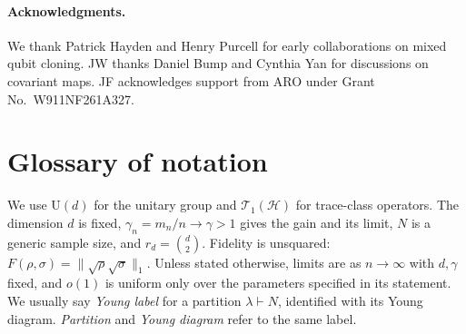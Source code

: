 \documentclass[11pt]{article}
\theoremstyle{remark}
\theoremstyle{plain}
\newcommand{\cH}{\mathcal H}
\newcommand{\cT}{\mathcal T}
\newcommand{\U}{\mathrm U}
\begin{document}
\paragraph{Acknowledgments.}
We thank Patrick Hayden and Henry Purcell for early collaborations on
mixed qubit cloning.  JW thanks Daniel Bump and Cynthia Yan for
discussions on covariant maps.  JF acknowledges support from ARO under
Grant No.~W911NF261A327.

\section*{Glossary of notation}

We use \(\U(d)\) for the unitary group and \(\cT_1(\cH)\) for
trace-class operators.  The dimension \(d\) is fixed,
\(\gamma_n=m_n/n\to\gamma>1\) gives the gain and its limit, \(N\) is
a generic sample size, and \(r_d=\binom d2\).  Fidelity is unsquared:
\(F(\rho,\sigma)=\|\sqrt\rho\sqrt\sigma\|_1\).  Unless stated otherwise,
limits are as \(n\to\infty\) with \(d,\gamma\) fixed, and \(o(1)\) is
uniform only over the parameters specified in its statement.  We usually
say \emph{Young label} for a partition \(\lambda\vdash N\), identified with
its Young diagram. \emph{Partition} and \emph{Young diagram} refer to the
same label.
\end{document}
